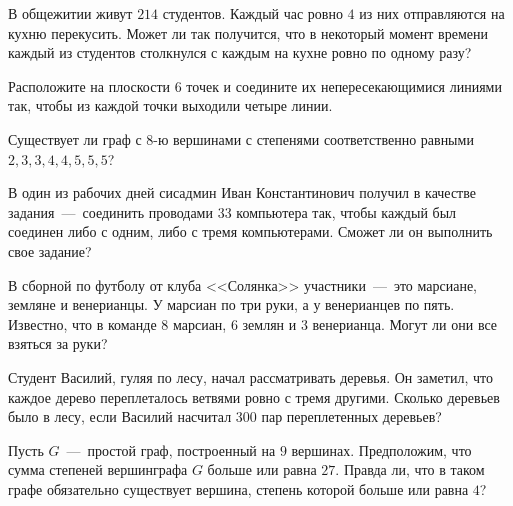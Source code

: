 \begin{exersize}
	В общежитии живут $214$ студентов. Каждый час ровно $4$ из них отправляются на кухню перекусить. 
	Может ли так получится, что в некоторый момент времени каждый из студентов столкнулся с каждым на кухне ровно по одному разу?
\end{exersize}

\begin{exersize}
	Расположите на плоскости 6 точек и соедините их непересекающимися линиями так, чтобы из каждой точки выходили четыре линии.
\end{exersize}

\begin{exersize}
	Существует ли граф с $8$-ю вершинами с степенями соответственно равными $2, 3, 3, 4, 4, 5, 5, 5$?
\end{exersize}

\begin{exersize}
	В один из рабочих дней сисадмин Иван Константинович получил в качестве задания~---~соединить проводами $33$ компьютера так, 
	чтобы каждый был соединен либо с одним, либо с тремя компьютерами. Сможет ли он выполнить свое задание?
\end{exersize}

\begin{exersize}
	В сборной по футболу от клуба <<Солянка>> участники~---~это марсиане, земляне и венерианцы. У марсиан по три руки, а у венерианцев по пять. 
	Известно, что в команде $8$ марсиан, $6$ землян и $3$ венерианца. Могут ли они все взяться за руки?
\end{exersize}

\begin{exersize}
	Студент Василий, гуляя по лесу, начал рассматривать деревья. Он заметил, что каждое дерево переплеталось ветвями ровно с тремя другими. 
	Сколько деревьев было в лесу, если Василий насчитал $300$ пар переплетенных деревьев?
\end{exersize}

\begin{exersize}
	Пусть $G$~---~простой граф, построенный на $9$ вершинах. Предположим, что сумма 
	степеней вершинграфа $G$ больше или равна $27$. Правда ли, что в таком графе
	обязательно существует вершина, степень которой больше или равна $4$?
\end{exersize}


